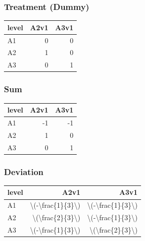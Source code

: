 \documentclass[]{book}
\begin{document}
\hypertarget{treatment-dummy}{%
\subsubsection{Treatment (Dummy)}\label{treatment-dummy}}

\begin{table}[H]
\centering
\begin{tabular}{l|r|r}
\hline
level & A2v1 & A3v1\\
\hline
A1 & 0 & 0\\
\hline
A2 & 1 & 0\\
\hline
A3 & 0 & 1\\
\hline
\end{tabular}
\end{table}

\hypertarget{sum}{%
\subsubsection{Sum}\label{sum}}

\begin{table}[H]
\centering
\begin{tabular}{l|r|r}
\hline
level & A2v1 & A3v1\\
\hline
A1 & -1 & -1\\
\hline
A2 & 1 & 0\\
\hline
A3 & 0 & 1\\
\hline
\end{tabular}
\end{table}

\hypertarget{deviation}{%
\subsubsection{Deviation}\label{deviation}}

\begin{table}[H]
\centering
\begin{tabular}{l|r|r}
\hline
level & A2v1 & A3v1\\
\hline
A1 & \textbackslash{}(-\textbackslash{}frac\{1\}\{3\}\textbackslash{}) & \textbackslash{}(-\textbackslash{}frac\{1\}\{3\}\textbackslash{})\\
\hline
A2 & \textbackslash{}(\textbackslash{}frac\{2\}\{3\}\textbackslash{}) & \textbackslash{}(-\textbackslash{}frac\{1\}\{3\}\textbackslash{})\\
\hline
A3 & \textbackslash{}(-\textbackslash{}frac\{1\}\{3\}\textbackslash{}) & \textbackslash{}(\textbackslash{}frac\{2\}\{3\}\textbackslash{})\\
\hline
\end{tabular}
\end{table}
\end{document}
